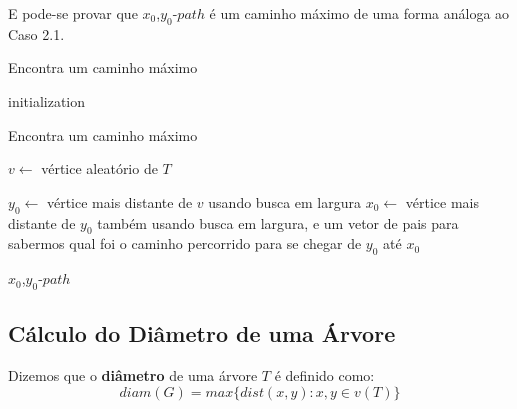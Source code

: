 \documentclass[a4paper,12pt]{article}
\begin{document}
\begin{itemize}

			E pode-se provar que $x_0$,$y_0$-$path$ é um caminho
			máximo de uma forma análoga ao Caso 2.1.


			\begin{algorithm}[H]

				\caption{Encontra um caminho máximo}
				initialization\;
			\end{algorithm}	


			\begin{algorithm}[H]

				\caption{Encontra um caminho máximo}
				$v \leftarrow$ vértice aleatório de $T$\;

				$y_0 \leftarrow$ vértice mais distante de $v$
				usando busca em largura\;
				$x_0 \leftarrow$ vértice mais distante de $y_0$
				também usando busca em largura, e um vetor de 
				pais para sabermos qual foi o caminho percorrido
				para se chegar de $y_0$ até $x_0$\;

				\Return $x_0$,$y_0$-$path$\;
				
			\end{algorithm}	




        \end{itemize}

    	\newpage


    \subsection{Cálculo do Diâmetro de uma Árvore}
    	Dizemos que o \textbf{diâmetro} de uma árvore $T$ é
    	definido como:
    	$$ diam(G)=max\{dist(x,y):x,y\in v(T)\} $$
    


\newpage
    
    
    
\end{document}
